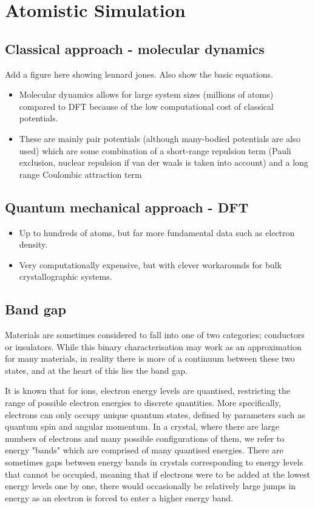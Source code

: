 \section{Atomistic Simulation}

\subsection{Classical approach - molecular dynamics}

Add a figure here showing lennard jones. Also show the basic equations.

\begin{itemize}
\item Molecular dynamics allows for large system sizes (millions of atoms) compared to DFT because of the low computational cost of classical potentials. 
\item These are mainly pair potentials (although many-bodied potentials are also used) which are some combination of a short-range repulsion term (Pauli exclusion, nuclear repulsion if van der waals is taken into account) and a long range Coulombic attraction term
\end{itemize}

\subsection{Quantum mechanical approach - DFT}

\begin{itemize}
\item Up to hundreds of atoms, but far more fundamental data such as electron density.
\item Very computationally expensive, but with clever workarounds for bulk crystallographic systems.
\end{itemize}

\subsection{Band gap}

Materials are sometimes considered to fall into one of two categories; conductors or insulators. While this binary characterisation may work as an approximation for many materials, in reality there is more of a continuum between these two states, and at the heart of this lies the band gap.

It is known that for ions, electron energy levels are quantised, restricting the range of possible electron energies to discrete quantities. More specifically, electrons can only occupy unique quantum states, defined by parameters such as quantum spin and angular momentum. In a crystal, where there are large numbers of electrons and many possible configurations of them, we refer to energy "bands" which are comprised of many quantised energies. There are sometimes gaps between energy bands in crystals corresponding to energy levels that cannot be occupied, meaning that if electrons were to be added at the lowest energy levels one by one, there would occasionally be relatively large jumps in energy as an electron is forced to enter a higher energy band. 

